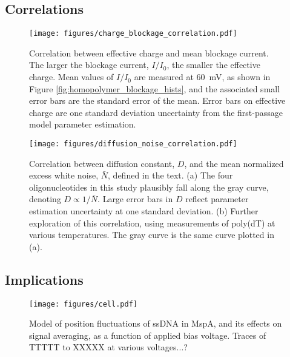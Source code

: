 \subsection{Correlations}

\begin{figure}[h]
\begin{centering}
\texttt{[image: figures/charge\_blockage\_correlation.pdf]}
\caption[Correlation between effective charge and current]{Correlation between effective charge and mean blockage current.  The larger the blockage current, $I/I_0$, the smaller the effective charge.  Mean values of $I/I_0$ are measured at \SI{60}{\mV}, as shown in Figure \ref{fig:homopolymer_blockage_hists}, and the associated small error bars are the standard error of the mean.  Error bars on effective charge are one standard deviation uncertainty from the first-passage model parameter estimation.}
\label{fig:charge_current_correlation}
\end{centering}
\end{figure}

\begin{figure}[h]
\begin{centering}
\texttt{[image: figures/diffusion\_noise\_correlation.pdf]}
\caption[Correlation between diffusion and noise]{Correlation between diffusion constant, $D$, and the mean normalized excess white noise, $\bar{N}$, defined in the text.  (a) The four oligonucleotides in this study plausibly fall along the gray curve, denoting $D \propto 1/\bar{N}$.  Large error bars in $D$ reflect parameter estimation uncertainty at one standard deviation.  (b) Further exploration of this correlation, using measurements of poly(dT) at various temperatures.  The gray curve is the same curve plotted in (a).}
\label{fig:diffusion_noise_correlation}
\end{centering}
\end{figure}

\subsection{Implications}

\begin{figure}[h]
\begin{centering}
\texttt{[image: figures/cell.pdf]}
\caption[Thermal motion averaging with voltage]{Model of position fluctuations of ssDNA in MspA, and its effects on signal averaging, as a function of applied bias voltage.  Traces of TTTTT to XXXXX at various voltages...?}
\label{fig:thermal_motion_projections}
\end{centering}
\end{figure}

